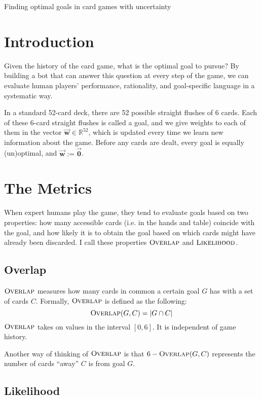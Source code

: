 \documentclass[11pt]{article}
\newcommand{\bvec}[1]{\vec{\mathbf{#1}}}
\newcommand{\R}{\mathbb{R}}
\newcommand{\overlap}{\textsc{Overlap}}
\newcommand{\lkhd}{\textsc{Likelihood}}
\begin{document}
\begin{center}
\Large{Finding optimal goals in card games with uncertainty}
\end{center}

\section{Introduction}

Given the history of the card game, what is the optimal goal to pursue? By building a bot that can answer this question at every step of the game, we can evaluate human players' performance, rationality, and goal-specific language in a systematic way.

In a standard 52-card deck, there are 52 possible straight flushes of 6 cards. Each of these 6-card straight flushes is called a goal, and we give weights to each of them in the vector $\bvec{w} \in \R^{52}$, which is updated every time we learn new information about the game. Before any cards are dealt, every goal is equally (un)optimal, and $\bvec{w} := \bvec{0}$.

\section{The Metrics}

When expert humans play the game, they tend to evaluate goals based on two properties: how many accessible cards (i.e. in the hands and table) coincide with the goal, and how likely it is to obtain the goal based on which cards might have already been discarded. I call these properties $\overlap$ and $\lkhd$.

\subsection{Overlap}

$\overlap$ measures how many cards in common a certain goal $G$ has with a set of cards $C$. Formally, $\overlap$ is defined as the following:
\begin{equation}
\overlap(G,C) = |G \cap C|
\label{eq:overlap} \end{equation}
$\overlap$ takes on values in the interval $[0,6]$. It is independent of game history.

Another way of thinking of $\overlap$ is that $6-\overlap(G,C)$ represents the number of cards ``away'' $C$ is from goal $G$.

\subsection{Likelihood}
\end{document}
